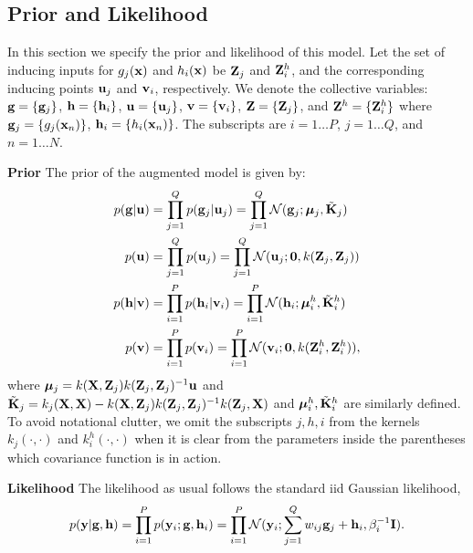 \documentclass{article} %
\begin{document}

\subsection{Prior and Likelihood}
In this section we specify the prior and likelihood of this model. 
\newcommand{\Zj}{\Z_j}
\newcommand{\Zhi}{\Z^h_i}
Let the set of inducing inputs for $g_j(\mathbf{x})$ and $h_i(\mathbf{x})$ be $\mathbf{Z}_j$ and $\mathbf{Z}^h_i$, and the corresponding inducing points $\mathbf{u}_j$ and $\mathbf{v}_i$, respectively.
We denote the collective variables: $\mathbf{g} = \{\mathbf{g}_j\}$, $\mathbf{h} = \{\mathbf{h}_i \}$, $\mathbf{u} = \{\mathbf{u}_j\}$, $\mathbf{v} = \{\mathbf{v}_i\}$, $\Z = \{\Zj\}$, and $\Z^h = \{\Zhi \}$ where $\mathbf{g}_j = \{g_j(\mathbf{x}_n)\}$, $\mathbf{h}_i = \{h_i(\mathbf{x}_n)\}$. 
The subscripts are $i = 1 \hdots P$, $j = 1 \hdots Q$, and $n = 1 \hdots N$.

\noindent
\textbf{Prior}
The prior of the augmented model is given by:
\begin{align}
p(\g | \u) &= \prod_{j=1}^Q p(\g_j | \u_j) = \prod_{j=1}^Q \Normal(\g_j; \BigMu_j, \tilde{\K}_j )\\
p(\u) &= \prod_{j=1}^Q p(\u_j) = \prod_{j=1}^Q \Normal(\u_j; \vec{0}, k(\Zj, \Zj)) \\
p(\h | \v) &= \prod_{i=1}^P p(\h_i | \v_i) = \prod_{i=1}^P \Normal(\h_i; \BigMu^h_i, \tilde{\K}^h_i)\\
p(\v) &= \prod_{i=1}^P p(\v_i) = \prod_{i=1}^P \Normal(\v_i; \vec{0}, k(\Zhi, \Zhi)),
\end{align}
where $\BigMu_j = k(\X,\Zj)k(\Zj,\Zj)^{-1}\u$ and $\tilde{\K}_j = k_j(\X,\X) - k(\X,\Zj)k(\Zj,\Zj)^{-1}k(\Zj,\X)$ and $\boldsymbol{\mu}^h_i, \tilde{\mathbf{K}}^h_i$ are similarly defined.
To avoid notational clutter, we omit the subscripts $j,h,i$ from the kernels $k_j(\cdot,\cdot)$ and $k^h_i(\cdot,\cdot)$ when it is clear from the parameters inside the parentheses which covariance function is in action. 

\noindent
\textbf{Likelihood}
The likelihood as usual follows the standard iid Gaussian likelihood,
\begin{align}
p(\mathbf{y} | \mathbf{g}, \mathbf{h} ) = \prod_{i=1}^P p( \mathbf{y}_i ; \mathbf{g}, \mathbf{h}_i) = \prod_{i=1}^P \mathcal{N}( \mathbf{y}_i ; \sum_{j=1}^Q w_{ij} \mathbf{g}_j + \mathbf{h}_i, \beta_i^{-1} \mathbf{I}).
\end{align}
\end{document}
